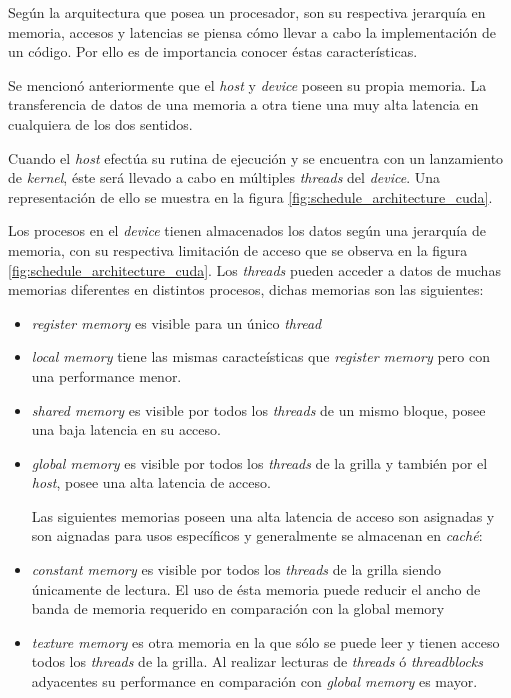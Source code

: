 Según la arquitectura que posea un procesador, son su respectiva jerarquía en memoria, accesos y latencias se piensa cómo llevar a cabo la implementación de un código. Por ello es de importancia conocer éstas características. 

Se mencionó anteriormente que el \textit{host} y \textit{device} poseen su propia memoria. La transferencia de datos de una memoria a otra tiene una muy alta latencia en cualquiera de los dos sentidos. 


Cuando el \textit{host} efectúa su rutina de ejecución y se encuentra con un lanzamiento de \textit{kernel}, éste será llevado a cabo en múltiples \textit{threads} del \textit{device}. Una representación de ello se muestra en la figura \ref{fig:schedule_architecture_cuda}. 

Los procesos en el \textit{device} tienen almacenados los datos según una jerarquía de memoria, con su respectiva limitación de acceso que se observa en la figura \ref{fig:schedule_architecture_cuda}. Los \textit{threads} pueden acceder a datos de muchas memorias diferentes en distintos procesos, dichas memorias son las siguientes:

\begin{itemize}
	\item  \textit{register memory} es visible para un único \textit{thread}
	\item \textit{local memory} tiene las mismas caracteísticas que \textit{register memory} pero con una performance menor.
	\item \textit{shared memory} es visible por todos los \textit{threads} de un mismo bloque, posee una baja latencia en su acceso.
	\item \textit{global memory} es visible por todos los \textit{threads} de la grilla y también por el \textit{host}, posee una alta latencia de acceso.
	
	Las siguientes memorias poseen una alta latencia de acceso son asignadas y son aignadas para usos específicos y generalmente se almacenan en \textit{caché}:
	
	\item \textit{constant memory} es visible por todos los \textit{threads} de la grilla siendo únicamente de lectura. El uso de ésta memoria puede reducir el ancho de banda de memoria requerido en comparación con la {global memory}
	\item \textit{texture memory} es otra memoria en la que sólo se puede leer y tienen acceso todos los \textit{threads} de la grilla. Al realizar lecturas de \textit{threads} ó \textit{threadblocks} adyacentes su performance en comparación con \textit{global memory} es mayor. 
	
\end{itemize}

